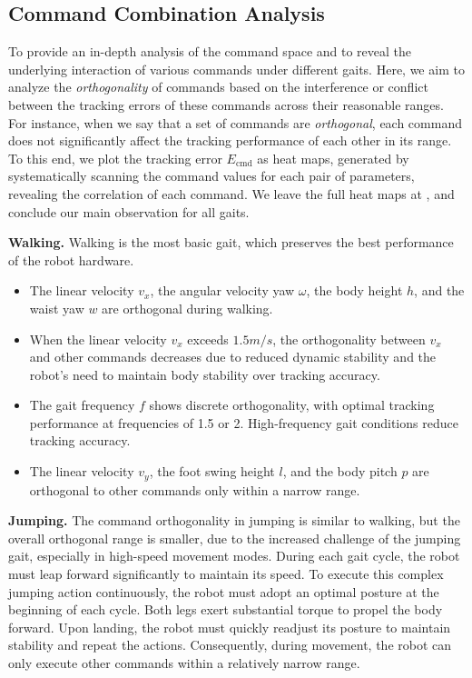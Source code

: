 \subsection{Command Combination Analysis}
To provide an in-depth analysis of the command space and to 
reveal the underlying interaction of various commands under different gaits.
Here, we aim to analyze the \emph{orthogonality} of commands based on the interference or conflict between the tracking errors of these commands across their reasonable ranges. For instance, when we say that a set of commands are \emph{orthogonal}, each command does not significantly affect the tracking performance of each other in its range. To this end, we plot the tracking error $E_\text{cmd}$ as heat maps, generated by systematically scanning the command values for each pair of parameters, revealing the correlation of each command.
We leave the full heat maps at , and conclude our main observation for all gaits.

\noindent\textbf{Walking.} Walking is the most basic gait, which preserves the best performance of the robot hardware.
\begin{itemize}[leftmargin=*]
    \item The {linear velocity} $v_x$, the {angular velocity yaw} $\omega$, the {body height} $h$, and the {waist yaw} $w$ are orthogonal during walking.
    \item When the {linear velocity} $v_x$ exceeds $1.5m/s$, the orthogonality between $v_x$ and other commands decreases due to reduced dynamic stability and the robot's need to maintain body stability over tracking accuracy.
    \item The {gait frequency} $f$ shows discrete orthogonality, with optimal tracking performance at frequencies of 1.5 or 2. High-frequency gait conditions reduce tracking accuracy.
    \item The {linear velocity} $v_y$, the {foot swing height} $l$, and the {body pitch} $p$ are orthogonal to other commands only within a narrow range.
\end{itemize}

\noindent\textbf{Jumping.} The command orthogonality in jumping is similar to walking, but the overall orthogonal range is smaller, due to the increased challenge of the jumping gait, especially in high-speed movement modes.
During each gait cycle, the robot must leap forward significantly to maintain its speed. To execute this complex jumping action continuously, the robot must adopt an optimal posture at the beginning of each cycle. Both legs exert substantial torque to propel the body forward. Upon landing, the robot must quickly readjust its posture to maintain stability and repeat the actions. Consequently, during movement, the robot can only execute other commands within a relatively narrow range.

